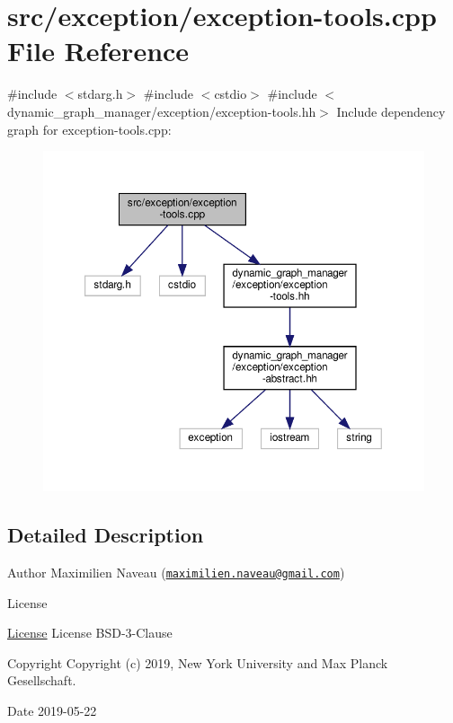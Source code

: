 \hypertarget{exception-tools_8cpp}{}\section{src/exception/exception-\/tools.cpp File Reference}
\label{exception-tools_8cpp}
{\ttfamily \#include $<$stdarg.\+h$>$}\newline
{\ttfamily \#include $<$cstdio$>$}\newline
{\ttfamily \#include $<$dynamic\+\_\+graph\+\_\+manager/exception/exception-\/tools.\+hh$>$}\newline
Include dependency graph for exception-\/tools.cpp\+:
\nopagebreak
\begin{figure}[H]
\begin{center}
\leavevmode
\includegraphics[width=350pt]{exception-tools_8cpp__incl}
\end{center}
\end{figure}


\subsection{Detailed Description}
\begin{DoxyAuthor}{Author}
Maximilien Naveau (\href{mailto:maximilien.naveau@gmail.com}{\tt maximilien.\+naveau@gmail.\+com}) 
\end{DoxyAuthor}
\begin{DoxyRefDesc}{License}
\item[\hyperlink{license__license000050}{License}]License B\+S\+D-\/3-\/\+Clause \end{DoxyRefDesc}
\begin{DoxyCopyright}{Copyright}
Copyright (c) 2019, New York University and Max Planck Gesellschaft. 
\end{DoxyCopyright}
\begin{DoxyDate}{Date}
2019-\/05-\/22 
\end{DoxyDate}
